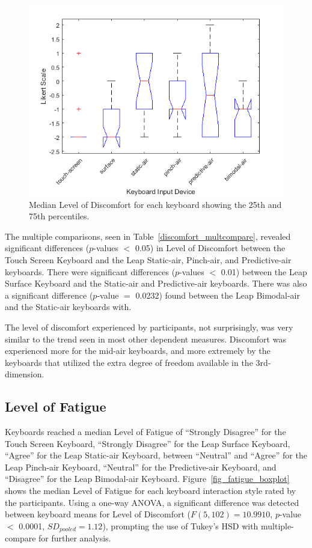\begin{figure}[!t]
	\centering
	\includegraphics{Figures/fig_discomfort_boxplot}
	\caption[Level of Discomfort Boxplot]{Median Level of Discomfort for each keyboard showing the 25th and 75th percentiles.}
	\label{fig_discomfort_boxplot}
\end{figure}

The multiple comparisons, seen in Table~\ref{discomfort_multcompare}, revealed significant differences ($p$-values $<$ 0.05) in Level of Discomfort between the Touch Screen Keyboard and the Leap Static-air, Pinch-air, and Predictive-air keyboards. There were significant differences ($p$-values $<$ 0.01) between the Leap Surface Keyboard and the Static-air and Predictive-air keyboards. There was also a significant difference ($p$-value $=$ 0.0232) found between the Leap Bimodal-air and the Static-air keyboards with.

The level of discomfort experienced by participants, not surprisingly, was very similar to the trend seen in most other dependent measures. Discomfort was experienced more for the mid-air keyboards, and more extremely by the keyboards that utilized the extra degree of freedom available in the 3rd-dimension.

\subsection{Level of Fatigue}
Keyboards reached a median Level of Fatigue of ``Strongly Disagree'' for the Touch Screen Keyboard, ``Strongly Disagree'' for the Leap Surface Keyboard, ``Agree'' for the Leap Static-air Keyboard, between ``Neutral'' and ``Agree'' for the Leap Pinch-air Keyboard, ``Neutral'' for the Predictive-air Keyboard, and ``Disagree'' for the Leap Bimodal-air Keyboard. Figure~\ref{fig_fatigue_boxplot} shows the median Level of Fatigue for each keyboard interaction style rated by the participants. Using a one-way ANOVA, a significant difference was detected between keyboard means for Level of Discomfort ($F(5, 102) = 10.9910$, $p$-value $<$ 0.0001, $SD_{pooled} = 1.12$), prompting the use of Tukey's HSD with multiple-compare for further analysis.

